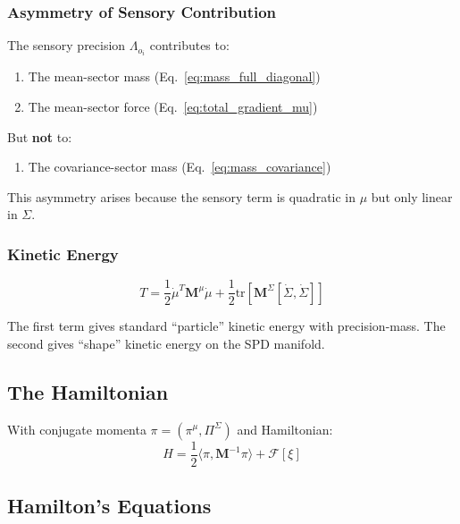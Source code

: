 \documentclass[12pt]{article}
\begin{document}
\subsubsection{Asymmetry of Sensory Contribution}

The sensory precision $\Lambda_{o_i}$ contributes to:
\begin{enumerate}
    \item The mean-sector mass (Eq.~\ref{eq:mass_full_diagonal})
    \item The mean-sector force (Eq.~\ref{eq:total_gradient_mu})
\end{enumerate}

But \textbf{not} to:
\begin{enumerate}
    \item The covariance-sector mass (Eq.~\ref{eq:mass_covariance})
\end{enumerate}

This asymmetry arises because the sensory term is quadratic in $\mu$ but only linear in $\Sigma$.

\subsubsection{Kinetic Energy}

\begin{equation}
T = \frac{1}{2}\dot{\mu}^T\mathbf{M}^\mu\dot{\mu} + \frac{1}{2}\mathrm{tr}\left[\mathbf{M}^\Sigma[\dot{\Sigma}, \dot{\Sigma}]\right]
\end{equation}

The first term gives standard ``particle'' kinetic energy with precision-mass. The second gives ``shape'' kinetic energy on the SPD manifold.

\subsection{The Hamiltonian}

With conjugate momenta $\pi = (\pi^\mu, \Pi^\Sigma)$ and Hamiltonian:
\begin{equation}
\boxed{
H = \frac{1}{2}\langle\pi, \mathbf{M}^{-1}\pi\rangle + \mathcal{F}[\xi]
}
\label{eq:hamiltonian}
\end{equation}

\subsection{Hamilton's Equations}
\end{document}
